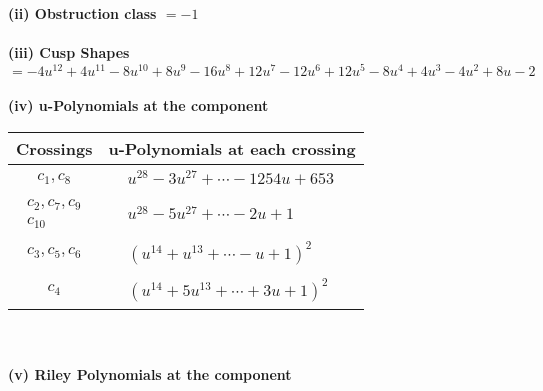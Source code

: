 \documentclass[1p]{elsarticle_modified}
\theoremstyle{definition}
\begin{document}
\flushleft \textbf{(ii) Obstruction class $= -1$}\\~\\
\flushleft \textbf{(iii) Cusp Shapes $= -4 u^{12}+4 u^{11}-8 u^{10}+8 u^9-16 u^8+12 u^7-12 u^6+12 u^5-8 u^4+4 u^3-4 u^2+8 u-2$}\\~\\
\newpage\renewcommand{\arraystretch}{1}
\flushleft \textbf{(iv) u-Polynomials at the component}\newline \\
\begin{tabular}{m{50pt}|m{274pt}}
Crossings & \hspace{64pt}u-Polynomials at each crossing \\
\hline $$\begin{aligned}c_{1},c_{8}\end{aligned}$$&$\begin{aligned}
&u^{28}-3 u^{27}+\cdots-1254 u+653
\end{aligned}$\\
\hline $$\begin{aligned}c_{2},c_{7},c_{9}\\c_{10}\end{aligned}$$&$\begin{aligned}
&u^{28}-5 u^{27}+\cdots-2 u+1
\end{aligned}$\\
\hline $$\begin{aligned}c_{3},c_{5},c_{6}\end{aligned}$$&$\begin{aligned}
&(u^{14}+u^{13}+\cdots- u+1)^{2}
\end{aligned}$\\
\hline $$\begin{aligned}c_{4}\end{aligned}$$&$\begin{aligned}
&(u^{14}+5 u^{13}+\cdots+3 u+1)^{2}
\end{aligned}$\\
\hline
\end{tabular}\\~\\
\newpage\renewcommand{\arraystretch}{1}
\flushleft \textbf{(v) Riley Polynomials at the component}\newline \\
\end{document}
